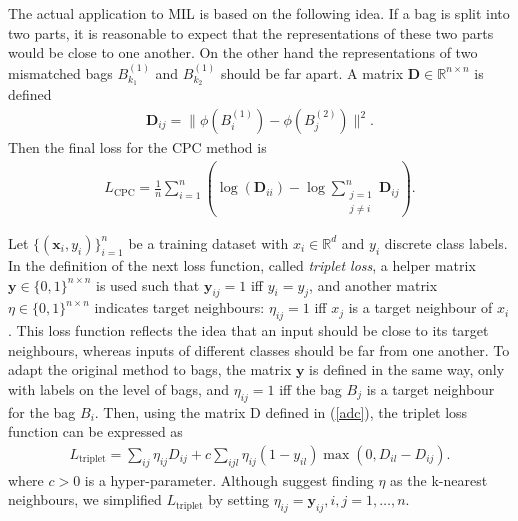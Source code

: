 \documentclass[a4paper]{llncs}
\begin{document}
The actual application to MIL is based on the following idea. If a bag is split into two parts, it is reasonable to expect that the representations of these two parts would be close to one another. On the other hand the representations of two mismatched bags $B^{ (1) }_{k_1}$ and $B^{ (1) }_{k_2}$ should be far apart. A matrix $\mathbf{D}\in\mathbb{R}^{n\times n}$ is defined
\begin{gather}\label{adc}
	\mathbf{D}_{ij} = \| \phi \left( B_i^{(1)} \right) - \phi \left( B_j^{(2)} \right) \|^2.
\end{gather}
Then the final loss for the CPC method is
\begin{gather}
	L_\mathrm{CPC} = \frac{1}{n} \sum_{i = 1}^n \left( \log \left( \mathbf{D}_{ii} \right) - \log \sum_{\substack{j = 1 \\ j \neq i}}^n \mathbf{D}_{ij} \right).
\end{gather}

Let $\{( \mathbf{x}_i, y_i ) \}_{i = 1}^n$ be a training dataset with $x_i\in \mathbb{R}^d$ and $y_i$ discrete class labels. In the definition of the next loss function, called \emph{triplet loss}, a helper matrix $\mathbf{y}\in\{0,1\}^{n\times n}$ is used such that $\mathbf{y}_{ij} =1$ iff $y_i = y_j$, and another matrix $\eta\in\{0,1\}^{n\times n}$ indicates target neighbours: $\eta_{ij} = 1$ iff $x_j$ is a target neighbour of $x_i$. This loss function reflects the idea that an input should be close to its target neighbours, whereas inputs of different classes should be far from one another. To adapt the original method to bags, the matrix $\mathbf{y}$ is defined in the same way, only with labels on the level of bags, and $\eta_{ij} = 1$ iff the bag $B_j$ is a target neighbour for the bag $B_i$. Then, using the matrix D defined in (\ref{adc}), the triplet loss function can be expressed as
\begin{gather}
	L_\mathrm{triplet} = \sum_{ij} \eta_{ij} D_{ij} + c \sum_{ijl} \eta_{ij} \left( 1 - y_{il} \right) \max\left(0, D_{il} - D_{ij} \right).
\end{gather}
where  $c > 0$ is a hyper-parameter. Although \cite{weinberger_distance_2006} suggest finding  $\eta$ as the k-nearest neighbours, we simplified $L_\mathrm{triplet}$ by setting $\eta_{ij} = \mathbf{y}_{ij},i,j=1,\dots,n$.
\end{document}
